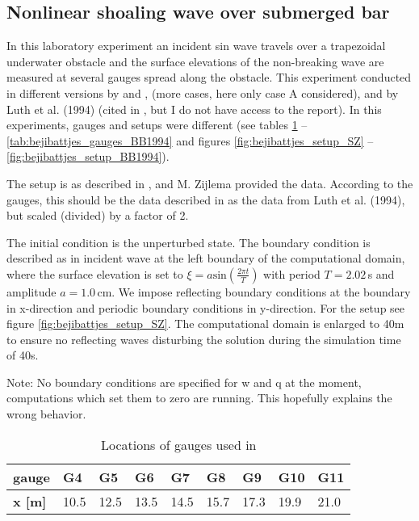 \subsection{Nonlinear shoaling wave over submerged bar}
In this laboratory experiment an incident sin wave travels over a trapezoidal underwater obstacle and the surface elevations of the non-breaking wave are measured at several gauges spread along the obstacle.
This experiment conducted in different versions by \cite{BejiBattjes.1993} and \cite{BejiBattjes.1994}, \cite{Dingemans.1994} (more cases, here only case A considered), and by Luth et al. (1994) (cited in \cite{Dingemans.1994}, but I do not have access to the report). 
In this experiments, gauges and setups were different (see tables \ref{tab:bejibattjes_gauges_SZ} -- \ref{tab:bejibattjes_gauges_BB1994} and figures \ref{fig:bejibattjes_setup_SZ} -- \ref{fig:bejibattjes_setup_BB1994}).

The setup is as described in \cite{StellingZijlema.2003}, and M. Zijlema provided the data. According to the gauges, this should be the data described in \cite{Dingemans.1994, StellingZijlema.2003} as the data from Luth et al. (1994), but scaled (divided) by a factor of 2. 

The initial condition is the unperturbed state. The boundary condition is described as in incident wave at the left boundary of the computational domain, where the surface elevation is set to $\xi=a \text{sin}\left(\frac{2\pi t}{T}\right)$ with period $T=2.02 \,$s and amplitude $a=1.0\,$cm.
We impose reflecting boundary conditions at the boundary in x-direction and periodic boundary conditions in y-direction. For the setup see figure \ref{fig:bejibattjes_setup_SZ}. The computational domain is enlarged to 40m to ensure no reflecting waves disturbing the solution during the simulation time of 40s.

Note: No boundary conditions are specified for w and q at the moment, computations which set them to zero are running. This hopefully explains the wrong behavior. 


\begin{table}[htbp]
\begin{tabular}{lllllllll}
\textbf{gauge} & G4 & G5 & G6 & G7 & G8 & G9 & G10 & G11 \\
\toprule
\textbf{x [m]} & 10.5 & 12.5 & 13.5 & 14.5 & 15.7 & 17.3 & 19.9 & 21.0 \\
\bottomrule
\end{tabular}
\caption{Locations of gauges used in \cite{StellingZijlema.2003}}
\label{tab:bejibattjes_gauges_SZ}
\end{table}

